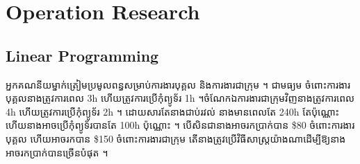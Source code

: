 

\setlength{\tabcolsep}{5pt}
\renewcommand{\arraystretch}{1.65}


	
\chapter{Operation Research}

\section{Linear Programming}

\begin{exercise}
	អ្នកគណនីយម្នាក់ត្រៀមប្រមូលពន្ធសម្រាប់ការងារបុគ្គល និងការងារជាក្រុម ។
  ជាមធ្យម ចំពោះការងារបុគ្គលនាងត្រូវការពេល 3h ហើយត្រូវការប្រើកុំព្យូទ័រ 1h ។
  ​ចំណែកឯការងារជាក្រុមវិញនាងត្រូវការពេល 4h ហើយត្រូវការប្រើកុំព្យូទ័រ 2h ។
  ដោយសារតែនាងជាប់រវល់ នាងមានពេលតែ 240h តែប៉ុណ្ណោះ
  ហើយនាងអាចប្រើកុំព្យូទ័របានតែ 100h ប៉ុណ្ណោះ ។ បើសិនជានាងអាចរកប្រាក់បាន
  \$80 ចំពោះការងារបុគ្គល ហើយអាចរកបាន \$150 ចំពោះការងារជាក្រុម
  តើនាងត្រូវប្រើវិធីសាស្ត្រយ៉ាងណាដើម្បីឱ្យនាងអាចរកប្រាក់បានច្រើនបំផុត ។
\end{exercise}
